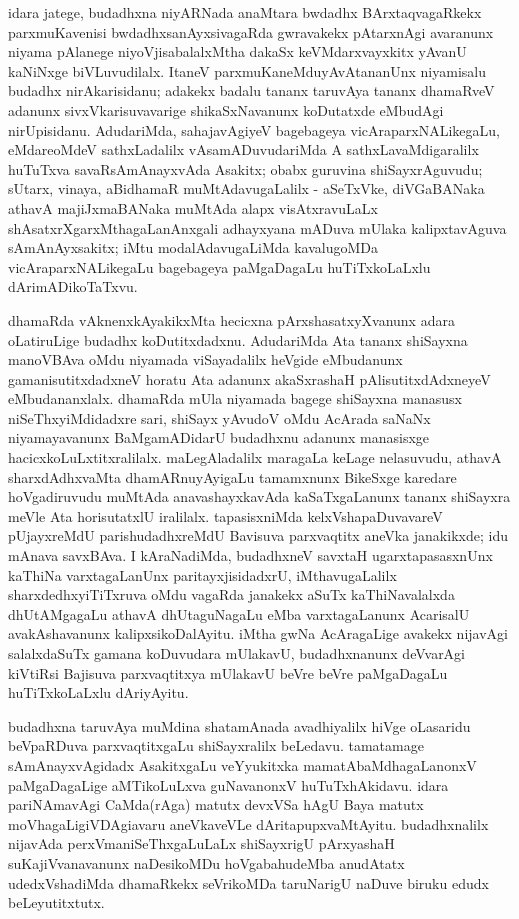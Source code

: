 idara jatege, budadhxna niyARNada anaMtara bwdadhx BArxtaqvagaRkekx parxmuKa\-venisi bwdadhxsanAyxsivagaRda gwravakekx pAtarxnAgi avaranunx niyama pAlanege niyoVjisa\break\-balalxMtha dakaSx keVMdarxvayxkitx yAvanU kaNiNxge biVLuvudilalx. ItaneV parxmuKaneMdu\break yAvAta\-nanUnx niyamisalu budadhx nirAkarisidanu; adakekx badalu tananx taruvAya tananx dhamaRveV adanunx sivxVkarisuvavarige shikaSxNavanunx koDutatxde eMbudAgi nirUpi\-sidanu. AdudariMda, sahajavAgiyeV bagebageya vicAraparxNALikegaLu, eMdare\break oMdeV sathxLadalilx vAsamADuvudariMda A sathxLavaMdigaralilx huTuTxva savaRsAmAnayxvAda Asakitx; obabx guruvina shiSayxrAguvudu; sUtarx, vinaya, aBidhamaR muMtA\-davugaLalilx - aSeTxVke, diVGaBANaka athavA majiJxmaBANaka muMtAda alapx visAtxra\-vuLaLx shAsatxrXgarxMthagaLanAnxgali adhayxyana mADuva mUlaka kalipxtavAguva sAmAnAyxsakitx; iMtu modalAdavugaLiMda kavalugoMDa vicAraparxNALikegaLu bagebageya paMgaDagaLu huTiTxkoLaLxlu dArimADikoTaTxvu.

dhamaRda vAknenxkAyakikxMta hecicxna pArxshasatxyXvanunx adara oLatiruLige budadhx koDutitxdadxnu. AdudariMda Ata tananx shiSayxna manoVBAva oMdu niyamada viSayadalilx heVgide eMbudanunx gamanisutitxdadxneV horatu Ata adanunx akaSxrashaH pAlisutitxdAdxneyeV eMbudananxlalx. dhamaRda mUla niyamada bagege shiSayxna manasusx niSeThxyiMdidadxre sari, shiSayx yAvudoV oMdu AcArada saNaNx niyamayavanunx BaMgamADidarU budadhxnu adanunx manasisxge hacicxkoLuLxtitxralilalx. maLegAladalilx maragaLa keLage nelasuvudu, athavA sharxdAdhxvaMta dhamARnuyAyigaLu tamamxnunx BikeSxge karedare hoVgadiruvudu muMtAda anavashayxkavAda kaSaTxgaLanunx tananx shiSayxra meVle Ata horisutatxlU iralilalx. tapasisxniMda kelxVshapaDuvavareV pUjayxreMdU parishudadhxreMdU Bavisuva parxvaqtitx aneVka janakikxde; idu mAnava savxBAva. I kAraNadiMda, budadhxneV savxtaH ugarxtapasasxnUnx kaThiNa varxtagaLanUnx paritayxjisidadxrU, iMthavugaLalilx sharxdedhxyiTiTxruva oMdu vagaRda janakekx aSuTx kaThiNavalalxda dhUtAMgagaLu athavA dhUtaguNagaLu eMba varxtagaLanunx AcarisalU avakAshavanunx kalipxsikoDalAyitu. iMtha gwNa AcAragaLige avakekx nijavAgi salalxdaSuTx gamana koDuvudara mUlakavU, budadhxnanunx deVvarAgi kiVtiRsi Bajisuva parxvaqtitxya mUlakavU beVre beVre paMgaDagaLu huTiTxkoLaLxlu dAriyAyitu.

budadhxna taruvAya muMdina shatamAnada avadhiyalilx hiVge oLasaridu beVpaR\-Duva parxvaqtitxgaLu shiSayxralilx beLedavu. tamatamage sAmAnayxvAgidadx AsakitxgaLu veYyu\-kitxka mamatAbaMdhagaLanonxV paMgaDagaLige aMTikoLuLxva guNavanonxV huTuTxhAkidavu. idara pariNAmavAgi CaMda(rAga) matutx devxVSa hAgU Baya matutx moVhagaLi\-giVDAgi\break avaru aneVkaveVLe dAritapupxvaMtAyitu. budadhxnalilx nijavAda perxVmaniSeThxgaLuLaLx shiSayx\-rigU pArxyashaH suKajiVvanavanunx naDesikoMDu hoVgabahudeMba anudAtatx udedxVsha\-diMda dhamaRkekx seVrikoMDa taruNarigU naDuve biruku edudx beLeyutitxtutx.

